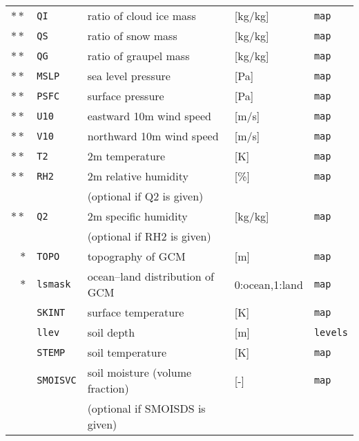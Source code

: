 {\begin{table}[bth]
\begin{center}
\begin{tabularx}{150mm}{rl|l|l|X}
$\ast\ast$ &\verb|QI|      & ratio of cloud ice mass          & [kg/kg]        & \verb|map|         \\
$\ast\ast$ &\verb|QS|      & ratio of snow mass               & [kg/kg]        & \verb|map|         \\
$\ast\ast$ &\verb|QG|      & ratio of graupel mass            & [kg/kg]        & \verb|map|         \\
$\ast\ast$ &\verb|MSLP|    & sea level pressure               & [Pa]           & \verb|map|         \\
$\ast\ast$ &\verb|PSFC|    & surface pressure                 & [Pa]           & \verb|map|         \\
$\ast\ast$ &\verb|U10|     & eastward 10m wind speed          & [m/s]          & \verb|map|         \\
$\ast\ast$ &\verb|V10|     & northward 10m wind speed         & [m/s]          & \verb|map|         \\
$\ast\ast$ &\verb|T2|      & 2m temperature                   & [K]            & \verb|map|         \\
$\ast\ast$ &\verb|RH2|     & 2m relative humidity             & [\%]           & \verb|map|         \\
           &               & (optional if Q2 is given)        &                &                    \\
$\ast\ast$ &\verb|Q2|      & 2m specific humidity             & [kg/kg]        & \verb|map|         \\
           &               & (optional if RH2 is given)       &                &                    \\
    $\ast$ &\verb|TOPO|    & topography of GCM                & [m]            & \verb|map|         \\
    $\ast$ &\verb|lsmask|  & ocean--land distribution of GCM  & 0:ocean,1:land & \verb|map|         \\
           &\verb|SKINT|   & surface temperature              & [K]            & \verb|map|         \\
           &\verb|llev|    & soil depth                       & [m]            & \verb|levels|      \\
           &\verb|STEMP|   & soil temperature                 & [K]            & \verb|map|         \\
           &\verb|SMOISVC| & soil moisture (volume fraction)  & [-]            & \verb|map|         \\
           &               & (optional if SMOISDS is given)   &                &                    \\

\end{tabularx}
\end{center}
\end{table}}
